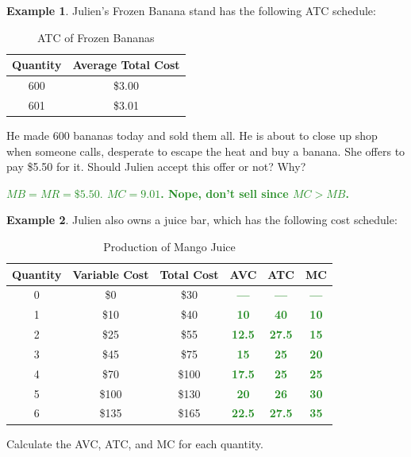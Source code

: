 \documentclass[11pt]{article}\usepackage[]{graphicx}\usepackage[]{color}
\theoremstyle{definition}
\newtheorem{exmp}{Example}[section]
\newcommand{\ddp}[1]{{\textbf{\textcolor{ForestGreen}{#1}}}}
\begin{document}
	\begin{exmp}
		Julien's Frozen Banana stand has the following ATC schedule:
	
	\begin{table}[ht]
		\centering
		\caption{ATC of Frozen Bananas}
		\begin{tabular}{ c|c}        
			
			Quantity & Average Total Cost \\
			\hline
			600 & \$3.00 \\
			601 & \$3.01 \\
		\end{tabular}
	\end{table} 
	
	He made 600 bananas today and sold them all. He is about to close up shop when someone calls, desperate to escape the heat and buy a banana. She offers to pay \$5.50 for it. Should Julien accept this offer or not? Why?
	\end{exmp} 
	\ddp{$MB = MR = \$5.50.$ $MC = 9.01$. Nope, don't sell since $MC>MB$.}
	
	\begin{exmp} Julien also owns a juice bar, which has the following cost schedule:
	
	\begin{table}[H]
		\centering
		\caption{Production of Mango Juice}
		\begin{tabular}{ c|c|c|c|c|c}        
			
			Quantity & Variable Cost & Total Cost & AVC & ATC & MC \\
			\hline
			0 & \$0 &\$30 & \ddp{---} & \ddp{---} & \ddp{---} \\
			1 & \$10 & \$40 & \ddp{10} & \ddp{40} & \ddp{10} \\
			2 & \$25 & \$55 & \ddp{12.5} & \ddp{27.5} & \ddp{15}\\
			3 & \$45 & \$75 & \ddp{15} & \ddp{25} & \ddp{20} \\
			4 & \$70 & \$100 & \ddp{17.5} & \ddp{25} & \ddp{25} \\
			5 & \$100 & \$130 &  \ddp{20} & \ddp{26} & \ddp{30} \\
			6 & \$135 & \$165 &  \ddp{22.5} & \ddp{27.5} & \ddp{35}\\
		\end{tabular}
	\end{table} 
	
	Calculate the AVC, ATC, and MC for each quantity.
\end{exmp}
	
\end{document}
